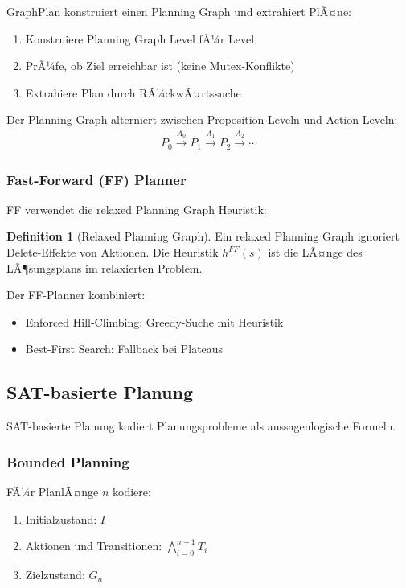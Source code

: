 ﻿\documentclass[a4paper,12pt]{article}
\theoremstyle{definition}
\newtheorem{definition}{Definition}[section]
\begin{document}
GraphPlan konstruiert einen Planning Graph und extrahiert PlÃ¤ne:

\begin{enumerate}
	\item Konstruiere Planning Graph Level fÃ¼r Level
	\item PrÃ¼fe, ob Ziel erreichbar ist (keine Mutex-Konflikte)
	\item Extrahiere Plan durch RÃ¼ckwÃ¤rtssuche
\end{enumerate}

Der Planning Graph alterniert zwischen Proposition-Leveln und Action-Leveln:
\begin{align}
P_0 \xrightarrow{A_0} P_1 \xrightarrow{A_1} P_2 \xrightarrow{A_2} \cdots
\end{align}

\subsubsection{Fast-Forward (FF) Planner}

FF verwendet die relaxed Planning Graph Heuristik:

\begin{definition}[Relaxed Planning Graph]
	Ein relaxed Planning Graph ignoriert Delete-Effekte von Aktionen. Die Heuristik $h^{FF}(s)$ ist die LÃ¤nge des LÃ¶sungsplans im relaxierten Problem.
\end{definition}

Der FF-Planner kombiniert:
\begin{itemize}
	\item[-] Enforced Hill-Climbing: Greedy-Suche mit Heuristik
	\item[-] Best-First Search: Fallback bei Plateaus
\end{itemize}

\subsection{SAT-basierte Planung}

SAT-basierte Planung kodiert Planungsprobleme als aussagenlogische Formeln.

\subsubsection{Bounded Planning}

FÃ¼r PlanlÃ¤nge $n$ kodiere:
\begin{enumerate}
	\item Initialzustand: $I$
	\item Aktionen und Transitionen: $\bigwedge_{i=0}^{n-1} T_i$
	\item Zielzustand: $G_n$
\end{enumerate}
\end{document}
